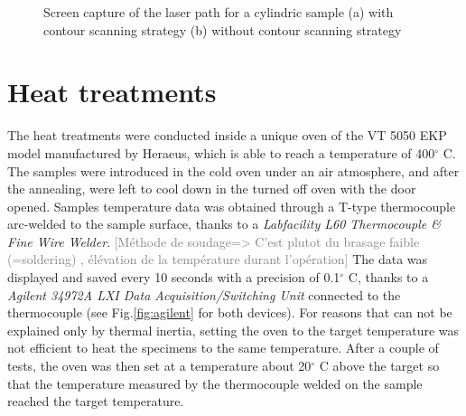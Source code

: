 \begin{figure}[ht]
\centering
\noindent{}
\decoRule
\caption[Screen capture of the laser path for a cylindric sample (a) with contour scanning strategy (b) without contour scanning strategy]{Screen capture of the laser path for a cylindric sample (a) with contour scanning strategy (b) without contour scanning strategy}
\label{fig:LasCSC}
\end{figure}

\section{Heat treatments}
\label{MMHT}
The heat treatments were conducted inside a unique oven of the VT 5050 EKP model manufactured by Heraeus, which is able to reach a temperature of 400$^\circ$ C. The samples were introduced in the cold oven under an air atmosphere, and after the annealing, were left to cool down in the turned off oven with the door opened. Samples temperature data was obtained through a T-type thermocouple arc-welded to the sample surface, thanks to a \textit{Labfacility L60 Thermocouple \& Fine Wire Welder}. \textcolor{gray}{[Méthode de soudage=> C'est plutot du brasage faible (=soldering) , élévation de la température durant l'opération]} The data was displayed and saved every 10 seconds with a precision of 0.1$^\circ$ C, thanks to a \textit{Agilent 34972A LXI Data Acquisition/Switching Unit} connected to the thermocouple (see Fig.\ref{fig:agilent} for both devices). For reasons that can not be explained only by thermal inertia, setting the oven to the target temperature was not efficient to heat the specimens to the same temperature. After a couple of tests, the oven was then set at a temperature about 20$^\circ$ C above the target so that the temperature measured by the thermocouple welded on the sample reached the target temperature.\\

